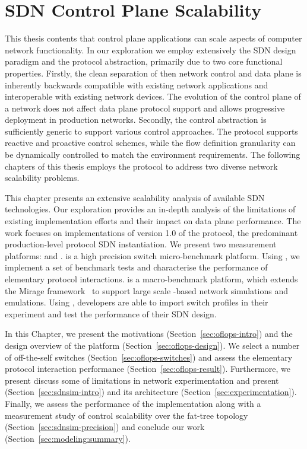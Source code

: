 \chapter{SDN Control Plane Scalability} \label{sec:sdn_scalability} 
\ifpdf
    \graphicspath{{Chapter1/Chapter1Figs/PNG/}{Chapter1/Chapter1Figs/PDF/}{Chapter1/Chapter1Figs/}}
\else
    \graphicspath{{Chapter1/Chapter1Figs/EPS/}{Chapter1/Chapter1Figs/}}
\fi

This thesis contents that control plane applications can scale aspects of
computer network functionality. In our exploration we employ extensively the SDN
design paradigm and the \of protocol abstraction, primarily due to two core
functional properties.  Firstly, the clean separation of then network control
and data plane is inherently backwards compatible with existing network
applications and interoperable with existing network devices.  The evolution of
the control plane of a network does not affect data plane protocol support and
allows progressive deployment in production networks.  Secondly, the \of control
abstraction is sufficiently generic to support various control approaches. The
protocol supports reactive and proactive control schemes, while the flow
definition granularity can be dynamically controlled to match the environment
requirements. The following chapters of this thesis employs the \of protocol to
address two diverse network scalability problems. 

This chapter presents an extensive scalability analysis of available SDN
technologies. Our exploration provides an in-depth analysis of the limitations
of existing implementation efforts and their impact on data plane performance.
The work focuses on implementations of version 1.0 of the \of protocol, the
predominant production-level protocol SDN instantiation.  We present two
measurement platforms: \oflops and \sdnsim.  \oflops is a high precision \of
switch micro-benchmark platform. Using \oflops, we implement a set of benchmark
tests and characterise the performance of elementary protocol interactions.
\sdnsim is a macro-benchmark \of platform, which extends the Mirage
framework~ to support large scale \of-based network
simulations and emulations.  Using \sdnsim, developers are able to import
\oflops switch profiles in their experiment and test the performance of their
SDN design.

In this Chapter, we present the motivations (Section~\ref{sec:oflops-intro}) and
the design overview of the \oflops platform (Section~\ref{sec:oflops-design}).
We select a number of off-the-self \of switches
(Section~\ref{sec:oflops-switches}) and assess the elementary protocol interaction performance
(Section~\ref{sec:oflops-result}). Furthermore, we present discuss some of
limitations in network experimentation and present \sdnsim 
(Section~\ref{sec:sdnsim-intro}) and its architecture
(Section~\ref{sec:experimentation}). Finally, we assess the performance of the
\sdnsim implementation along with a measurement study of control
scalability over the fat-tree topology (Section~\ref{sec:sdnsim-precision})
and conclude our work (Section~\ref{sec:modeling:summary}). 

